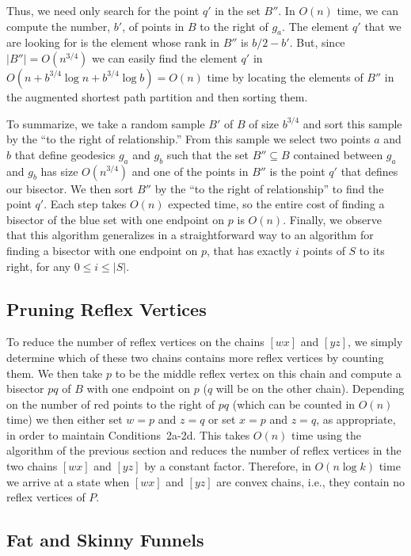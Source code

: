 \documentclass[charterfonts,lotsofwhite]{patmorin}
\newcommand{\chain}[2]{[#1#2]}
\begin{document}
Thus, we need only search for the point $q'$ in the set $B''$.  In
$O(n)$ time, we can compute the number, $b'$, of points in $B$ to the
right of $g_a$.  The element $q'$ that we are looking for is the
element whose rank in $B''$ is $b/2-b'$.  But, since
$|B''|=O(n^{3/4})$ we can easily find the element $q'$ in
$O(n+b^{3/4}\log n+b^{3/4}\log b) = O(n)$ time by locating the
elements of $B''$ in the augmented shortest path partition and then
sorting them. 

To summarize, we take a random sample $B'$ of $B$ of size $b^{3/4}$
and sort this sample by the ``to the right of relationship.''  From
this sample we select two points $a$ and $b$ that define geodesics
$g_a$ and $g_b$ such that the set $B''\subseteq B$ contained between
$g_a$ and $g_b$ has size $O(n^{3/4})$ and one of the points in $B''$
is the point  $q'$ that defines our bisector.  We then sort $B''$ by
the ``to the right of relationship'' to find the point $q'$.  Each
step takes $O(n)$ expected time, so the entire cost of finding a
bisector of the blue set with one endpoint on $p$ is $O(n)$.  Finally,
we observe that this algorithm generalizes in a straightforward way to
an algorithm for finding a bisector with one endpoint on $p$, that has
exactly $i$ points of $S$ to its right, for any $0\le i\le |S|$.

\subsection{Pruning Reflex Vertices}

To reduce the number of reflex vertices on the chains $\chain{w}{x}$
and $\chain{y}{z}$, we simply determine which of these two chains
contains more reflex vertices by counting them.  We then take $p$ to
be the middle reflex vertex on this chain and compute a bisector $pq$
of $B$ with one endpoint on $p$ ($q$ will be on the other chain).
Depending on the number of red points to the right of $pq$ (which can
be counted in $O(n)$ time) we then either set $w=p$ and $z=q$ or set $x=p$
and $z=q$, as appropriate, in order to maintain Conditions~2a-2d.  This
takes $O(n)$ time using the algorithm of the previous section and
reduces the number of reflex vertices in the two chains $\chain{w}{x}$
and $\chain{y}{z}$ by a constant factor.  Therefore, in $O(n\log k)$
time we arrive at a state when $\chain{w}{x}$ and $\chain{y}{z}$ are
convex chains, i.e., they contain no reflex vertices of $P$.

\subsection{Fat and Skinny Funnels}
\end{document}
